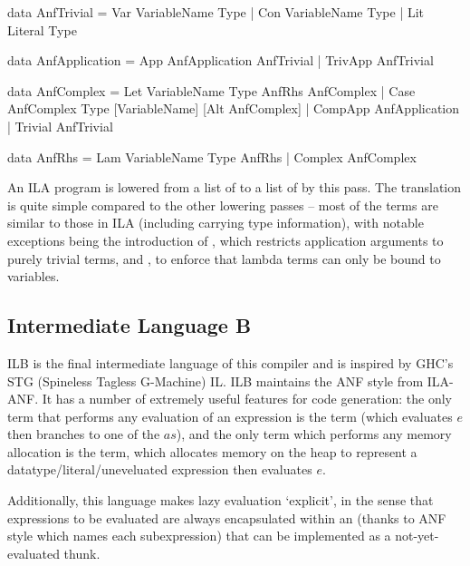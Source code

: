 \documentclass[dissertation.tex]{subfiles}
\begin{document}
{{        \begin{haskellfigure}
        data AnfTrivial = Var VariableName Type
                        | Con VariableName Type
                        | Lit Literal Type

        data AnfApplication = App AnfApplication AnfTrivial
                            | TrivApp AnfTrivial

        data AnfComplex = Let VariableName Type AnfRhs AnfComplex
                        | Case AnfComplex Type [VariableName] [Alt AnfComplex]
                        | CompApp AnfApplication
                        | Trivial AnfTrivial

        data AnfRhs = Lam VariableName Type AnfRhs
                    | Complex AnfComplex
        \end{haskellfigure}

        An ILA program is lowered from a list of  to a list of  by
        this pass. The translation is quite simple compared to the other lowering passes -- most of the terms are
        similar to those in ILA (including carrying type information), with notable exceptions being the
        introduction of , which restricts application arguments to purely trivial terms, and
        , to enforce that lambda terms can only be bound to variables.

    }
    \subsection{Intermediate Language B}
    {

        ILB is the final intermediate language of this compiler and is inspired by GHC's STG (Spineless Tagless
        G-Machine) IL. ILB maintains the ANF style from ILA-ANF. It has a number of extremely useful features for
        code generation: the only term that performs any evaluation of an expression is the  term (which evaluates \(e\) then branches to one of the \(as\)), and the only term which
        performs any memory allocation is the \haskell{ExpLit #\(v\ r\ e\)#} term, which allocates memory on the
        heap to represent a datatype/literal/uneveluated expression then evaluates \(e\).

        Additionally, this language makes lazy evaluation `explicit', in the sense that expressions to be evaluated
        are always encapsulated within an \haskell{RhsClosure} (thanks to ANF style which names each subexpression)
        that can be implemented as a not-yet-evaluated thunk.

}}
\end{document}
